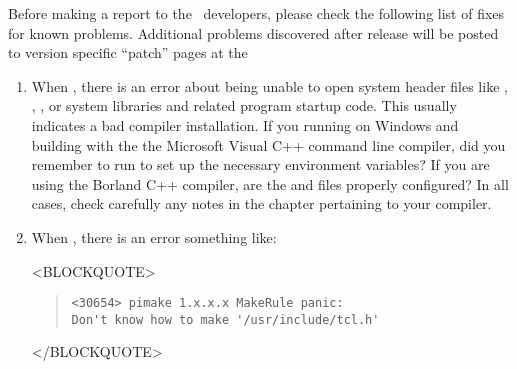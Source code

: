 Before making a report to the \OOMMF\ developers, please check the
following list of fixes for known problems.  Additional problems
discovered after release will be posted to version specific ``patch''
pages at the
\begin{enumerate}
\item When
,
there is an error about being unable to open system header files like
, , , or system libraries and related
program startup code.  This usually indicates a bad compiler
installation.  If you running on Windows and building with the the
Microsoft Visual C++ command line compiler, did you remember to run
 to set up the necessary environment variables?  If
you are using the Borland C++ compiler, are the  and
 files properly configured?  In all cases, check
carefully any notes in the chapter
 pertaining to your compiler.

\item When
,
there is an error something like:
\begin{rawhtml}<BLOCKQUOTE>\end{rawhtml}
\begin{quote}
\begin{verbatim}
<30654> pimake 1.x.x.x MakeRule panic:
Don't know how to make '/usr/include/tcl.h'
\end{verbatim}
\end{quote}
\begin{rawhtml}</BLOCKQUOTE>\end{rawhtml}


\end{enumerate}
